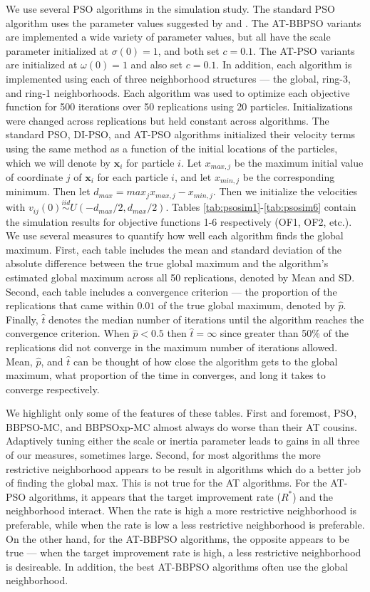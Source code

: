 \documentclass[12pt]{article}
\begin{document}
We use several PSO algorithms in the simulation study. The standard PSO algorithm uses the parameter values suggested by \cite{blum2008swarm} and \cite{clerc2002particle}. The AT-BBPSO variants are implemented a wide variety of parameter values, but all have the scale parameter initialized at $\sigma(0)=1$, and both set $c=0.1$. The AT-PSO variants are initialized at $\omega(0)=1$ and also set $c=0.1$. In addition, each algorithm is implemented using each of three neighborhood structures --- the global, ring-3, and ring-1 neighborhoods. Each algorithm was used to optimize each objective function for 500 iterations over 50 replications using 20 particles. Initializations were changed across replications but held constant across algorithms. The standard PSO, DI-PSO, and AT-PSO algorithms initialized their velocity terms using the same method as a function of the initial locations of the particles, which we will denote by $\bm{x}_i$ for particle $i$. Let $x_{max,j}$ be the maximum initial value of coordinate $j$ of $\bm{x}_i$ for each particle $i$, and let $x_{min,j}$ be the corresponding minimum. Then let $d_{max} = max_{j}x_{max,j} - x_{min,j}$. Then we initialize the velocities with $v_{ij}(0)\stackrel{iid}{\sim}U(-d_{max}/2,d_{max}/2)$. Tables \ref{tab:psosim1}-\ref{tab:psosim6} contain the simulation results for objective functions 1-6 respectively (OF1, OF2, etc.). We use several measures to quantify how well each algorithm finds the global maximum. First, each table includes the mean and standard deviation of the absolute difference between the true global maximum and the algorithm's estimated global maximum across all 50 replications, denoted by Mean and SD. Second, each table includes a convergence criterion --- the proportion of the replications that came within $0.01$ of the true global maximum, denoted by $\widehat{p}$. Finally, $\widehat{t}$ denotes the median number of iterations until the algorithm reaches the convergence criterion. When $\hat{p}<0.5$ then $\hat{t} = \infty$ since greater than 50\% of the replications did not converge in the maximum number of iterations allowed. Mean, $\hat{p}$, and $\hat{t}$ can be thought of how close the algorithm gets to the global maximum, what proportion of the time in converges, and long it takes to converge respectively.

We highlight only some of the features of these tables. First and foremost, PSO, BBPSO-MC, and BBPSOxp-MC almost always do worse than their AT cousins. Adaptively tuning either the scale or inertia parameter leads to gains in all three of our measures, sometimes large. Second, for most algorithms the more restrictive neighborhood appears to be result in algorithms which do a better job of finding the global max. This is not true for the AT algorithms. For the AT-PSO algorithms, it appears that the target improvement rate ($R^*$) and the neighborhood interact. When the rate is high a more restrictive neighborhood is preferable, while when the rate is low a less restrictive neighborhood is preferable. On the other hand, for the AT-BBPSO algorithms, the opposite appears to be true --- when the target improvement rate is high, a less restrictive neighborhood is desireable. In addition, the best AT-BBPSO algorithms often use the global neighborhood.
\end{document}
